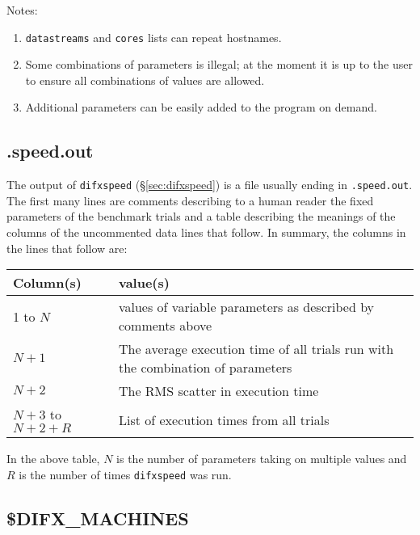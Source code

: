 \noindent
Notes: 
\begin{enumerate}
\item {\tt datastreams} and {\tt cores} lists can repeat hostnames.
\item Some combinations of parameters is illegal; at the moment it is up to the user to ensure all combinations of values are allowed.
\item Additional parameters can be easily added to the program on demand.
\end{enumerate}



\subsection{.speed.out} \label{sec:speed.out}

The output of {\tt difxspeed} (\S\ref{sec:difxspeed}) is a file usually ending in {\tt .speed.out}.
The first many lines are comments describing to a human reader the fixed parameters of the benchmark trials and a table describing the meanings of the columns of the uncommented data lines that follow.
In summary, the columns in the lines that follow are:

\begin{center}
\begin{tabular}{ll}
\hline
Column(s) & value(s) \\
\hline
1 to $N$ & values of variable parameters as described by comments above \\
$N+1$ & The average execution time of all trials run with the combination of parameters \\
$N+2$ & The RMS scatter in execution time \\
$N+3$ to $N+2+R$ & List of execution times from all trials \\
\hline
\end{tabular}
\end{center}

In the above table, $N$ is the number of parameters taking on multiple values and $R$ is the number of times {\tt difxspeed} was run.




\subsection{\$DIFX\_MACHINES} \label{sec:difxmachines}

